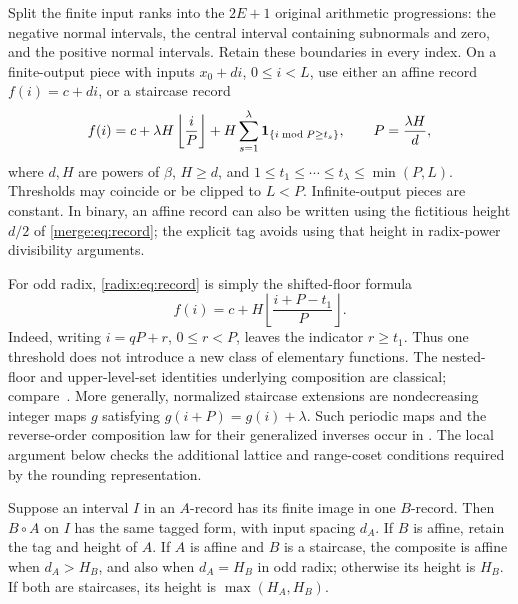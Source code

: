 Split the finite input ranks into the $2E+1$ original arithmetic
progressions: the negative normal intervals, the central interval
containing subnormals and zero, and the positive normal intervals.
Retain these boundaries in every index. On a finite-output piece with
inputs $x_0+di$, $0\leq i<L$, use either an affine record
$f(i)=c+di$, or a staircase record
\begin{equation}\label{radix:eq:record}
 f(i)=c+\lambda H\left\lfloor\frac{i}{P}\right\rfloor
       +H\sum_{s=1}^{\lambda}\mathbf{1}_{\{i\bmod P\geq t_s\}},
 \qquad P=\frac{\lambda H}{d},
\end{equation}
where $d,H$ are powers of $\beta$, $H\geq d$, and
$1\leq t_1\leq\cdots\leq t_\lambda\leq\min(P,L)$.
Thresholds may coincide or be clipped to $L<P$. Infinite-output pieces
are constant. In binary, an affine record can also be written using the
fictitious height $d/2$ of \eqref{merge:eq:record}; the explicit tag avoids
using that height in radix-power divisibility arguments.

For odd radix, \eqref{radix:eq:record} is simply the shifted-floor formula
\begin{equation}\label{radix:eq:floor}
 f(i)=c+H\left\lfloor\frac{i+P-t_1}{P}\right\rfloor.
\end{equation}
Indeed, writing $i=qP+r$, $0\leq r<P$, leaves the indicator $r\geq t_1$.
Thus one threshold does not introduce a new class of elementary functions.
The nested-floor and upper-level-set identities underlying composition
are classical; compare~\cite[Lemma~1]{ref25}. More generally, normalized
staircase extensions are nondecreasing integer maps $g$ satisfying
$g(i+P)=g(i)+\lambda$. Such periodic maps and the reverse-order
composition law for their generalized inverses occur in
\cite[Definition~2.2 and Proposition~4.1]{connesconsani2013}.
The local argument below checks the additional lattice and range-coset
conditions required by the rounding representation.

\begin{lemma}\label{radix:lem:closure}
Suppose an interval $I$ in an $A$-record has its finite image in one
$B$-record. Then $B\circ A$ on $I$ has the same tagged form, with input
spacing $d_A$. If $B$ is affine, retain the tag and height of $A$.
If $A$ is affine and $B$ is a staircase, the composite is affine when
$d_A>H_B$, and also when $d_A=H_B$ in odd radix; otherwise its height is
$H_B$. If both are staircases, its height is $\max(H_A,H_B)$.
\end{lemma}

